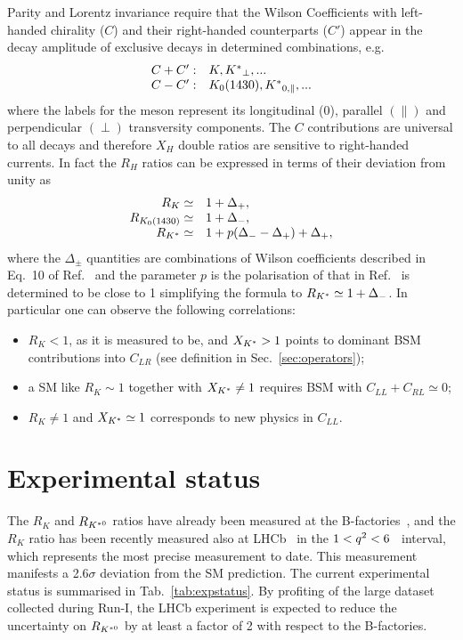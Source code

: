 Parity and Lorentz invariance require that the Wilson Coefficients with left-handed chirality ($C$)
and their right-handed counterparts ($C'$) appear in the decay amplitude of exclusive decays in
determined combinations, e.g.
\begin{equation}
\begin{array}{ll}
C+C': & K, {{K}^*}_{\perp}, ...  \\
C-C': & K_0(1430), {{K}^*}_{0,\parallel}, ...
\end{array}
\end{equation}
where the labels for the \Kstar meson represent its longitudinal (0), parallel $(\parallel)$ and
perpendicular $(\perp)$ transversity components. The $C$ contributions are universal to
all decays and therefore $X_H$ double ratios are sensitive to right-handed currents.
In fact the $R_H$ ratios can be expressed in terms of their deviation from unity as
\begin{equation}
\begin{array}{rl}
R_K \simeq 			& 1+ \Delta_+, 		\\
R_{K_0(1430)} \simeq 	& 1+ \Delta_-,		\\
R_{{K}^*} \simeq 		& 1+ p(\Delta_- - \Delta_+) + \Delta_+,
\end{array}
\end{equation}
where the $\Delta_\pm$ quantities are combinations of Wilson coefficients
described in Eq.~10 of Ref.~\cite{Hiller:2014ula} and the parameter $p$ is the polarisation of \Kstar
that in Ref.~\cite{Hiller:2014ula} is determined to be close to 1 simplifying the formula to $R_{{{K}^*}} \simeq 1+ \Delta_-$.
In particular one can observe the following correlations: 
\begin{itemize}
\item $R_K < 1$, as it is measured to be, and $X_{{{K}^*}} > 1$ points to dominant BSM contributions into $C_{LR}$ (see definition in Sec.~\ref{sec:operators});
\item a SM like $R_K \sim 1$ together with $X_{{{K}^*}} \neq 1$ requires BSM with $C_{LL} + C_{RL} \simeq 0$;
\item $R_K \neq 1$ and $X_{{{K}^*}} \simeq 1$ corresponds to new physics in $C_{LL}$.
\end{itemize}

\section{Experimental status}

The $R_K$ and $R_{{{K}^{*0}}}$ ratios have already been measured at the B-factories~\cite{Lees:2012tva,Wei:2009zv},
and the $R_K$ ratio has been recently measured also at LHCb~\cite{Aaij:2014ora} in the \mbox{$1 < {q^2} < 6$~\gevgevcccc \qsq} interval, which represents the most precise measurement to date. This measurement manifests a 2.6$\sigma$
deviation from the SM prediction. 
The current experimental status is summarised in Tab.~\ref{tab:expstatus}. By profiting of the large dataset collected during Run-I, the LHCb experiment is expected
to reduce the uncertainty on $R_{{{K}^{*0}}}$ by at least a factor of 2 with respect to the B-factories.

